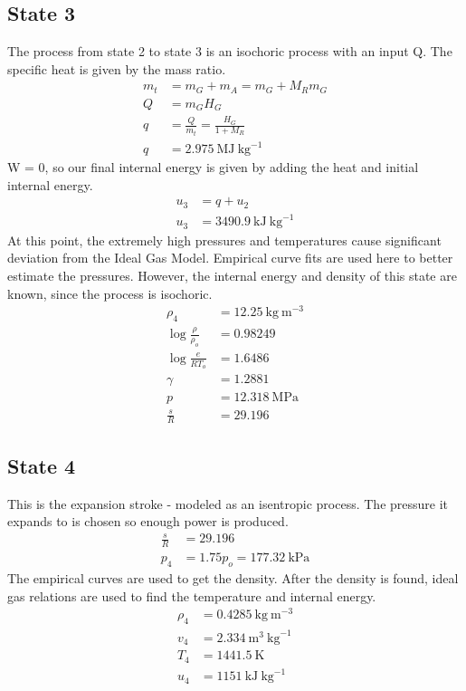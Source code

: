 \documentclass[10pt,a4paper]{article}
\begin{document}
	\subsection{State 3}
	The process from state 2 to state 3 is an isochoric process with an input Q. The specific heat is given by the mass ratio.
	\begin{align}
		m_t &= m_G + m_A = m_G + M_R m_G \\
		Q &= m_G H_G \\
		q &= \frac{Q}{m_t} = \frac{H_G}{1 + M_R}\\
		q &= 2.975\ \text{MJ}\ \text{kg}^{-1}
	\end{align}
	W = 0, so our final internal energy is given by adding the heat and initial internal energy.
	\begin{align}
		u_3 &= q + u_2\\
		u_3 &= 3490.9\ \text{kJ}\ \text{kg}^{-1}
	\end{align}
	At this point, the extremely high pressures and temperatures cause significant deviation from the Ideal Gas Model. Empirical curve fits are used here to better estimate the pressures.
	However, the internal energy and density of this state are known, since the process is isochoric.
	\begin{align}
		\rho_4 &=  12.25\ \text{kg}\ \text{m}^{-3}\\
		\log \frac{\rho}{\rho_o} &= 0.98249\\
		\log \frac{e}{R T_o} &= 1.6486\\
		\gamma &= 1.2881\\		
		p &= 12.318\ \text{MPa}\\
		\frac{s}{R} &= 29.196
	\end{align}
	\subsection{State 4}
	This is the expansion stroke - modeled as an isentropic process. The pressure it expands to is chosen so enough power is produced.
	\begin{align}
		\frac{s}{R} &= 29.196\\
		p_4 &= 1.75 p_o = 177.32\ \text{kPa}
	\end{align}
	The empirical curves are used to get the density. After the density is found, ideal gas relations are used to find the temperature and internal energy.
	\begin{align}
		\rho_4 &= 0.4285\ \text{kg}\ \text{m}^{-3}\\
		v_4 &= 2.334\ \text{m}^3\ \text{kg}^{-1}\\
		T_4 &= 1441.5\ \text{K}\\
		u_4 &= 1151\ \text{kJ}\ \text{kg}^{-1}
	\end{align}
\end{document}
